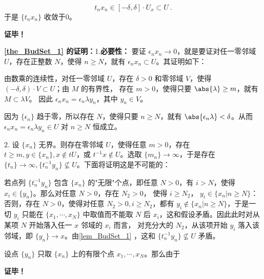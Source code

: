 \begin{equation}
t_nx_n\in[-\delta,\delta]\cdot U_x\subset U~.
\end{equation}
于是 $\{t_nx_n\}$ 收敛于0。

\textbf{证毕！}

\textbf{\autoref{the_BudSet_1} 的证明：}1.\textbf{必要性：} 要证 $\epsilon_n x_n\rightarrow0$，就是要证对任一零邻域 $U$，存在正整数 $N$，使得 $n\geq N$，就有 $\epsilon_n x_n\subset U$。其证明如下：

由数乘的连续性，对任一零邻域 $U$，存在 $\delta>0$ 和零邻域 $V$，使得 $(-\delta,\delta)\cdot V\subset U$；由 $M$ 的有界性， 存在 $m>0$，使得只要 $\abs{\lambda}\geq m$，就有 $M\subset\lambda V$。 因此 $\epsilon_nx_n=\epsilon_n \lambda y_n$，其中 $y_n\in V$。

因为 $\{\epsilon_n\}$ 趋于零，所以存在 $N$，使得只要 $n\geq N$，就有 $\abs{\epsilon_n\lambda}<\delta$。从而 $\epsilon_nx_n=\epsilon_n \lambda y_n\in U$ 对 $n\geq N$ 恒成立。


2. 设 $\{x_n\}$ 无界。则存在零邻域 $U$，使得任意 $m>0$，存在 $t\geq m,y\in\{x_n\},x\notin tU$，或 $t^{-1}x\notin U$。选取 $\{m_n\}\rightarrow\infty$，于是存在 $\{t_n\}\rightarrow\infty,\{t_n^{-1}y_n\}\nsubseteq U$。下面将证明这是不可能的：

若点列 $\{t_n^{-1}y_n\}$ 包含 $\{x_n\}$ 的"无限"个点，即任意 $N>0$，有 $i>N$，使得 $x_i\in\{y_n\}$。那么对任意 $N>0$，存在 $N_2>0$， 使得 $i\geq N_2$， $y_i\in \{x_n|n\geq N\}$：否则，存在 $N>0$，使得对任意 $N_2>0,i\geq N_2$，都有 $y_i\notin\{x_n|n\geq N\}$，于是一切 $y_i$ 只能在 $\{x_1,\cdots,x_N\}$ 中取值而不能取 $N$ 后 $x_i$，这和假设矛盾。因此此时对从某项 $N$ 开始落入任一 $x$ 邻域的 $x_i$ 而言， 对充分大的 $N_2$，从该项开始 $y_i$ 落入该邻域，即 $\{y_n\}\rightarrow x$。由\autoref{lem_BudSet_1} ，这和 $\{t_n^{-1}y_n\}\nsubseteq U$ 矛盾。 

 设点 $\{y_n\}$ 只取 $\{x_n\}$ 上的有限个点 $x_1,\cdots,x_N$。那么由于


\textbf{证毕！}











